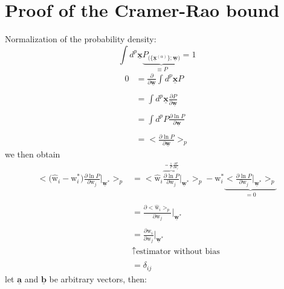 \documentclass[a4paper,11pt]{article}
\begin{document}
\section{Proof of the Cramer-Rao bound}
Normalization of the probability density:
\begin{equation}
	\int d^p \underline{\mathbf{x}} \underbrace{P_{ \big( 
		 \{ \underline{\mathbf{x}}^{(\alpha)} \} 
			; \underline{\mathbf{w}} 
		\big) } }_{\equiv P}= 1
\end{equation}
\begin{equation}
	\begin{array}{ll}
	0 & = \frac{\partial}{\partial \underline{\mathbf{w}}} \int d^p 
		\underline{\mathbf{x}} P\\\\
	& = \int d^p \underline{\mathbf{x}} 
		\frac{\partial P}{\partial \underline{\mathbf{w}}}\\\\
	& = \int d^p P \frac{\partial \ln P}{\partial\underline{\mathbf{w}}}\\\\
	& = \big<\frac{\partial \ln P}{\partial \underline{\mathbf{w}}} \big>_p
	\end{array}
\end{equation}
we then obtain
\begin{equation}
	\begin{array}{ll}
	\Big<\big(\hat{\mathrm{w}}_i - \mathrm{w}_i^* \big) 
		\frac{\partial \ln P}{\partial \mathrm{w}_j} 
		\Big|_{\underline{\mathbf{w}}^*} \Big>_p 
	& = \Big< \hat{\mathrm{w}}_i \frac{ \overbrace{\partial \ln P}^{ =
		\frac{1}{P} \frac{\partial P}{\partial \mathrm{w}_j}} 
		}{\partial \mathrm{w}_j} 
		\Big|_{\underline{\mathbf{w}}^*} \Big>_p - \mathrm{w}_i^* 
			\underbrace{\Big<\frac{\partial \ln P}
				{\partial \mathrm{w}_j}
			\Big|_{\underline{\mathbf{w}}^*} \Big>_p }_{= 0}\\\\
	& = \frac{\partial <\hat{\mathrm{w}}_i>_p}{\partial \mathrm{w}_j}
		\Big|_{\underline{\mathbf{w}}^*}\\\\
	& = \frac{\partial \mathrm{w}_i}{\partial \mathrm{w}_j} 
		\Big|_{\underline{\mathbf{w}}^*}\\
	& \uparrow \text{estimator without bias}\\\\
	& = \delta_{ij}
	\end{array}
\end{equation}
let $\underline{\mathbf{a}}$ and $\underline{\mathbf{b}}$ be arbitrary vectors, then:
\end{document}
